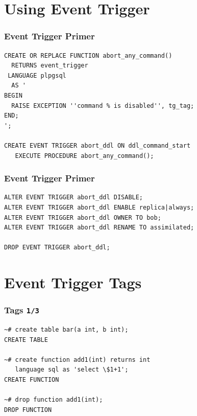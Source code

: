 \documentclass{beamer}
\begin{document}
\section{Using Event Trigger}

\begin{frame}[fragile]
  \frametitle{Event Trigger Primer}

\begin{verbatim}
CREATE OR REPLACE FUNCTION abort_any_command()
  RETURNS event_trigger
 LANGUAGE plpgsql
  AS '
BEGIN
  RAISE EXCEPTION ''command % is disabled'', tg_tag;
END;
';

CREATE EVENT TRIGGER abort_ddl ON ddl_command_start
   EXECUTE PROCEDURE abort_any_command();
\end{verbatim}
\end{frame}

\begin{frame}[fragile]
  \frametitle{Event Trigger Primer}

  \vfill

\begin{verbatim}
ALTER EVENT TRIGGER abort_ddl DISABLE;
ALTER EVENT TRIGGER abort_ddl ENABLE replica|always;
ALTER EVENT TRIGGER abort_ddl OWNER TO bob;
ALTER EVENT TRIGGER abort_ddl RENAME TO assimilated;

DROP EVENT TRIGGER abort_ddl;
\end{verbatim}
\end{frame}


\section{Event Trigger Tags}

\begin{frame}[fragile]
  \frametitle{Tags \texttt{1/3}}

\begin{verbatim}
~# create table bar(a int, b int);
CREATE TABLE

~# create function add1(int) returns int
   language sql as 'select \$1+1';
CREATE FUNCTION

~# drop function add1(int);
DROP FUNCTION
\end{verbatim}
\end{frame}
\end{document}
